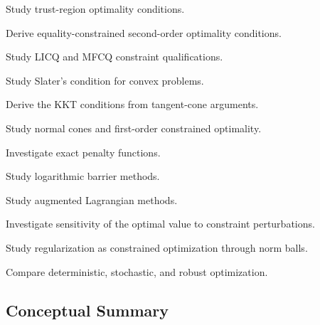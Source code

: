 \begin{exercise}[4]
Study trust-region optimality conditions.
\end{exercise}

\begin{exercise}[4]
Derive equality-constrained second-order optimality conditions.
\end{exercise}

\begin{exercise}[4]
Study LICQ and MFCQ constraint qualifications.
\end{exercise}

\begin{exercise}[4]
Study Slater's condition for convex problems.
\end{exercise}

\begin{exercise}[4]
Derive the KKT conditions from tangent-cone arguments.
\end{exercise}

\begin{exercise}[4]
Study normal cones and first-order constrained optimality.
\end{exercise}

\begin{exercise}[4]
Investigate exact penalty functions.
\end{exercise}

\begin{exercise}[4]
Study logarithmic barrier methods.
\end{exercise}

\begin{exercise}[4]
Study augmented Lagrangian methods.
\end{exercise}

\begin{exercise}[4]
Investigate sensitivity of the optimal value to constraint perturbations.
\end{exercise}

\begin{exercise}[4]
Study regularization as constrained optimization through norm balls.
\end{exercise}

\begin{exercise}[4]
Compare deterministic, stochastic, and robust optimization.
\end{exercise}

\subsection{Conceptual Summary}
\label{subsec:optimization-fundamentals-summary}

